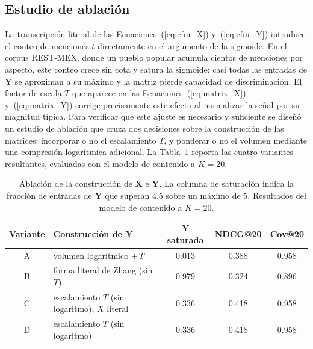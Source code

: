 \subsection*{Estudio de ablación}

La transcripción literal de las Ecuaciones~(\ref{eq:efm_X}) y~(\ref{eq:efm_Y}) introduce el
conteo de menciones $t$ directamente en el argumento de la sigmoide. En el corpus REST-MEX, donde
un pueblo popular acumula cientos de menciones por aspecto, este conteo crece sin cota y satura la
sigmoide: casi todas las entradas de $\mathbf{Y}$ se aproximan a su máximo y la matriz pierde
capacidad de discriminación. El factor de escala $T$ que aparece en las
Ecuaciones~(\ref{eq:matrix_X}) y~(\ref{eq:matrix_Y}) corrige precisamente este efecto al
normalizar la señal por su magnitud típica. Para verificar que este ajuste es necesario y
suficiente se diseñó un estudio de ablación que cruza dos decisiones sobre la construcción de las
matrices: incorporar o no el escalamiento $T$, y ponderar o no el volumen mediante una compresión
logarítmica adicional. La Tabla~\ref{tab:ablation} reporta las cuatro variantes resultantes,
evaluadas con el modelo de contenido a $K=20$.

\begin{table}[ht]
	\centering
	\caption{Ablación de la construcción de $\mathbf{X}$ e $\mathbf{Y}$. La columna de saturación
		indica la fracción de entradas de $\mathbf{Y}$ que superan 4.5 sobre un máximo de 5.
		Resultados del modelo de contenido a $K=20$.}
	\label{tab:ablation}
	\begin{tabular}{clccc}
		\toprule
		\textbf{Variante} & \textbf{Construcción de $\mathbf{Y}$}         & \textbf{$\mathbf{Y}$ saturada} & \textbf{NDCG@20} & \textbf{Cov@20} \\
		\midrule
		A                 & volumen logarítmico $+\,T$                    & 0.013                          & 0.388            & 0.958           \\
		B                 & forma literal de Zhang (sin $T$)              & 0.979                          & 0.324            & 0.896           \\
		C                 & escalamiento $T$ (sin logaritmo), $X$ literal & 0.336                          & 0.418            & 0.958           \\
		D                 & escalamiento $T$ (sin logaritmo)              & 0.336                          & 0.418            & 0.958           \\
		\bottomrule
	\end{tabular}
\end{table}

